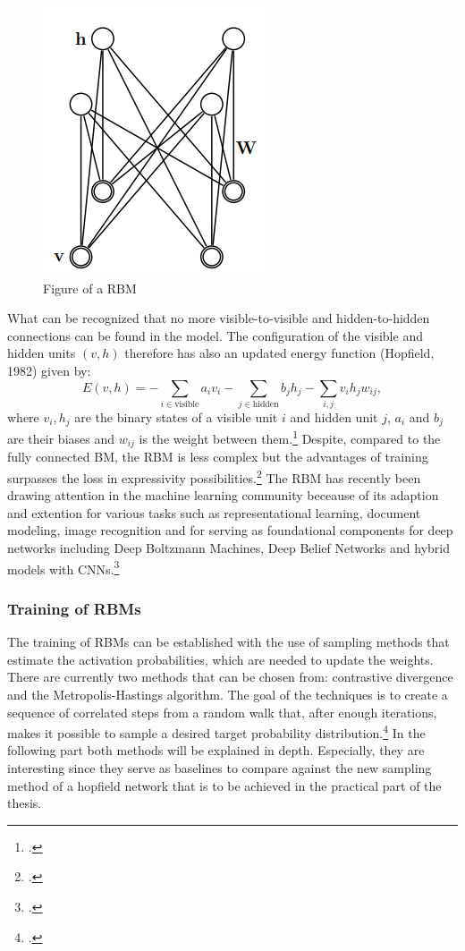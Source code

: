 \begin{figure}[H]
    \centering
    \includegraphics[width=0.25\linewidth]{graphics/RBM_Modell.png}
    \caption{Figure of a \ac{RBM}}
\end{figure}
What can be recognized that no more visible-to-visible and hidden-to-hidden connections can be found in the model.
The configuration of the visible and hidden units \( (v, h) \) therefore has also an updated energy function (Hopfield, 1982) given by:
\begin{equation}
E(v, h) = - \sum_{i \in \text{visible}} a_i v_i - \sum_{j \in \text{hidden}} b_j h_j - \sum_{i,j} v_i h_j w_{ij},
\end{equation}
where \( v_i, h_j \) are the binary states of a visible unit \( i \) and hidden unit \( j \), \( a_i \) and  \(  b_j \) are their biases and \( w_{ij} \) is the weight between them.\footcite[cf.][3-4]{hintonPracticalGuideTraining2012a}
Despite, compared to the fully connected \ac{BM}, the \ac{RBM} is less complex but the advantages of training surpasses the loss in expressivity possibilities.\footcite[cf.][4]{huembeliPhysicsEnergybasedModels2022}
The \ac{RBM} has recently been drawing attention in the machine learning community beceause of its adaption and extention for various tasks such as representational learning, document modeling, image recognition and for
serving as foundational components for deep networks including Deep Boltzmann Machines, Deep Belief Networks and hybrid models with CNNs.\footcite[cf.][1186]{zhangOverviewRestrictedBoltzmann2018}

\subsubsection{Training of \ac{RBM}s}

The training of \ac{RBM}s can be established with the use of sampling methods that estimate the activation probabilities, which are needed to update the weights.
There are currently two methods that can be chosen from: contrastive divergence and the Metropolis-Hastings algorithm. 
The goal of the techniques is to create a sequence of correlated steps from a random walk that, after enough iterations, makes it possible to sample a desired target probability distribution.\footcite[cf.][1]{patronOptimalRelaxationRate2024}
In the following part both methods will be explained in depth.
Especially, they are interesting since they serve as baselines to compare against the new sampling method of a hopfield network that is to be achieved in the practical part of the thesis.

